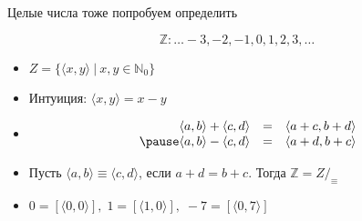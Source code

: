 \documentclass[aspectratio=169]{beamer}
\begin{document}
\begin{frame}{Целые числа тоже попробуем определить}

 $$\mathbb{Z}: \dots -3, -2, -1, 0, 1, 2, 3, \dots$$\pause\vspace{-0.5cm}
\begin{itemize}
\item     $Z = \{\langle x, y \rangle\ |\ x,y\in \mathbb{N}_0\}$ \pause
\item Интуиция: $\langle x,y\rangle = x-y$\pause
\item $$\begin{array}{rcl}
      \langle a, b \rangle + \langle c, d \rangle & = & \langle a + c, b + d \rangle \\ \pause
      \langle a, b \rangle - \langle c, d \rangle & = & \langle a + d, b + c \rangle 
  \end{array}$$\pause
\item     Пусть $\langle a, b \rangle \equiv \langle c,d\rangle$, если $a + d = b + c$. Тогда $\mathbb{Z} = Z/_\equiv$\pause
\item      $0 = [\langle 0,0 \rangle],\; 1 = [\langle 1,0\rangle],\; -7 = [\langle 0,7 \rangle]$

\end{itemize}
\end{frame}
\end{document}

